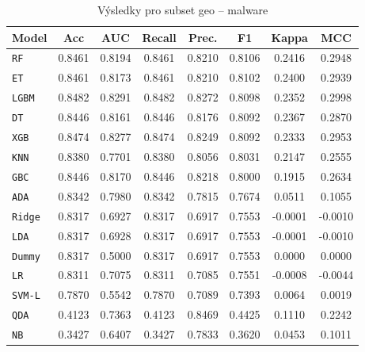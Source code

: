 \begin{table}[H]
  \centering
  \small
  \caption{Výsledky pro subset geo – malware}
  \begin{tabular}{|l|c|c|c|c|c|c|c|}
    \hline
    \textbf{Model} & \textbf{Acc} & \textbf{AUC} & \textbf{Recall} & \textbf{Prec.} & \textbf{F1} & \textbf{Kappa} & \textbf{MCC} \\
    \hline
    \texttt{RF} & 0.8461 & 0.8194 & 0.8461 & 0.8210 & 0.8106 & 0.2416 & 0.2948 \\
    \texttt{ET} & 0.8461 & 0.8173 & 0.8461 & 0.8210 & 0.8102 & 0.2400 & 0.2939 \\
    \texttt{LGBM} & 0.8482 & 0.8291 & 0.8482 & 0.8272 & 0.8098 & 0.2352 & 0.2998 \\
    \texttt{DT} & 0.8446 & 0.8161 & 0.8446 & 0.8176 & 0.8092 & 0.2367 & 0.2870 \\
    \texttt{XGB} & 0.8474 & 0.8277 & 0.8474 & 0.8249 & 0.8092 & 0.2333 & 0.2953 \\
    \texttt{KNN} & 0.8380 & 0.7701 & 0.8380 & 0.8056 & 0.8031 & 0.2147 & 0.2555 \\
    \texttt{GBC} & 0.8446 & 0.8170 & 0.8446 & 0.8218 & 0.8000 & 0.1915 & 0.2634 \\
    \texttt{ADA} & 0.8342 & 0.7980 & 0.8342 & 0.7815 & 0.7674 & 0.0511 & 0.1055 \\
    \texttt{Ridge} & 0.8317 & 0.6927 & 0.8317 & 0.6917 & 0.7553 & -0.0001 & -0.0010 \\
    \texttt{LDA} & 0.8317 & 0.6928 & 0.8317 & 0.6917 & 0.7553 & -0.0001 & -0.0010 \\
    \texttt{Dummy} & 0.8317 & 0.5000 & 0.8317 & 0.6917 & 0.7553 & 0.0000 & 0.0000 \\
    \texttt{LR} & 0.8311 & 0.7075 & 0.8311 & 0.7085 & 0.7551 & -0.0008 & -0.0044 \\
    \texttt{SVM-L} & 0.7870 & 0.5542 & 0.7870 & 0.7089 & 0.7393 & 0.0064 & 0.0019 \\
    \texttt{QDA} & 0.4123 & 0.7363 & 0.4123 & 0.8469 & 0.4425 & 0.1110 & 0.2242 \\
    \texttt{NB} & 0.3427 & 0.6407 & 0.3427 & 0.7833 & 0.3620 & 0.0453 & 0.1011 \\
    \hline
  \end{tabular}
\end{table}
\vspace{0.5cm}

